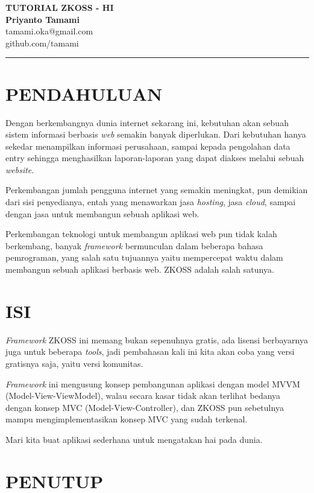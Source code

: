 \documentclass[pdftex, 12pt, oneside]{article}
\newcommand{\HRule}{\rule{\linewidth}{0.5mm}}
\begin{document}
\textbf{\large TUTORIAL ZKOSS - HI }
\\[1cm]
\textbf{Priyanto Tamami}\\
tamami.oka@gmail.com\\
github.com/tamami

\HRule

\section{PENDAHULUAN}

Dengan berkembangnya dunia internet sekarang ini, kebutuhan akan sebuah sistem informasi berbasis \textit{web} semakin banyak diperlukan. Dari kebutuhan hanya sekedar menampilkan informasi perusahaan, sampai kepada pengolahan data entry sehingga menghasilkan laporan-laporan yang dapat diakses melalui sebuah \textit{website}.

Perkembangan jumlah pengguna internet yang semakin meningkat, pun demikian dari sisi penyedianya, entah yang menawarkan jasa \textit{hosting}, jasa \textit{cloud}, sampai dengan jasa untuk membangun sebuah aplikasi web.

Perkembangan teknologi untuk membangun aplikasi web pun tidak kalah berkembang, banyak \textit{framework} bermunculan dalam beberapa bahasa pemrograman, yang salah satu tujuannya yaitu mempercepat waktu dalam membangun sebuah aplikasi berbasis web. ZKOSS adalah salah satunya.

\section{ISI}

\textit{Framework} ZKOSS ini memang bukan sepenuhnya gratis, ada lisensi berbayarnya juga untuk beberapa \textit{tools}, jadi pembahasan kali ini kita akan coba yang versi gratisnya saja, yaitu versi komunitas.

\textit{Framework} ini mengusung konsep pembangunan aplikasi dengan model MVVM (Model-View-ViewModel), walau secara kasar tidak akan terlihat bedanya dengan konsep MVC (Model-View-Controller), dan ZKOSS pun sebetulnya mampu mengimplementasikan konsep MVC yang sudah terkenal.

Mari kita buat aplikasi sederhana untuk mengatakan hai pada dunia.

\section{PENUTUP}
\end{document}

